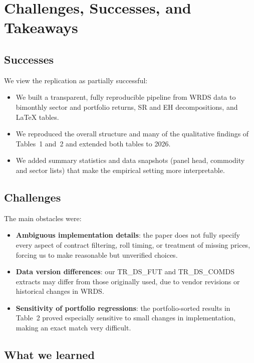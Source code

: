 \documentclass[11pt]{article}
\begin{document}
\section{Challenges, Successes, and Takeaways}

\subsection*{Successes}

We view the replication as partially successful:
\begin{itemize}
  \item We built a transparent, fully reproducible pipeline from WRDS data to
        bimonthly sector and portfolio returns, SR and EH decompositions, and
        \LaTeX{} tables.
  \item We reproduced the overall structure and many of the qualitative
        findings of Tables~1 and~2 and extended both tables to 2026.
  \item We added summary statistics and data snapshots (panel head, commodity
        and sector lists) that make the empirical setting more interpretable.
\end{itemize}

\subsection*{Challenges}

The main obstacles were:
\begin{itemize}
  \item \textbf{Ambiguous implementation details}: the paper does not fully
        specify every aspect of contract filtering, roll timing, or treatment
        of missing prices, forcing us to make reasonable but unverified
        choices.
  \item \textbf{Data version differences}: our TR\_DS\_FUT and TR\_DS\_COMDS
        extracts may differ from those originally used, due to vendor
        revisions or historical changes in WRDS.
  \item \textbf{Sensitivity of portfolio regressions}: the portfolio-sorted
        results in Table~2 proved especially sensitive to small changes in
        implementation, making an exact match very difficult.
\end{itemize}

\subsection*{What we learned}
\end{document}

